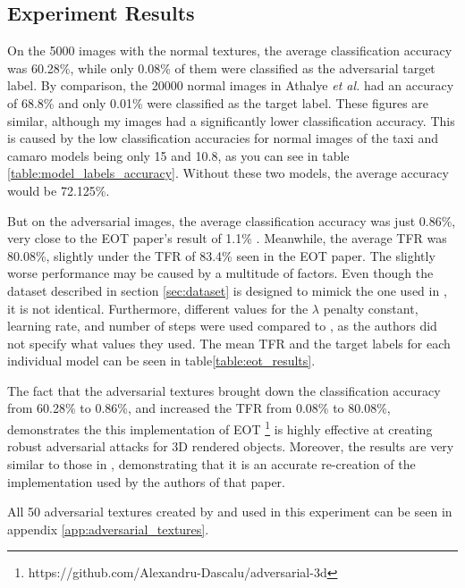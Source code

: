 \subsection{Experiment Results}

On the 5000 images with the normal textures, the average classification accuracy was 60.28\%, while only 0.08\% of them were classified as the adversarial target label. By comparison, the 20000 normal images in Athalye \textit{et al.} \cite{athalye} had an accuracy of 68.8\% and only 0.01\% were classified as the target label. These figures are similar, although my images had a significantly lower classification accuracy. This is caused by the low classification accuracies for normal images of the taxi and camaro models being only 15 and 10.8, as you can see in table \ref{table:model_labels_accuracy}. Without these two models, the average accuracy would be 72.125\%. 

But on the adversarial images, the average classification accuracy was just 0.86\%, very close to the EOT paper's result of 1.1\% \cite{athalye}. Meanwhile, the average TFR was 80.08\%, slightly under the TFR of 83.4\% seen in the EOT paper. The slightly worse performance may be caused by a multitude of factors. Even though the dataset described in section \ref{sec:dataset} is designed to mimick the one used in \cite{athalye}, it is not identical. Furthermore, different values for the $\lambda$ penalty constant, learning rate, and number of steps were used compared to \cite{athalye}, as the authors did not specify what values they used. The mean TFR and the target labels for each individual model can be seen in table\ref{table:eot_results}.

The fact that the adversarial textures brought down the classification accuracy from 60.28\% to 0.86\%, and increased the TFR from 0.08\% to 80.08\%, demonstrates the this implementation of EOT \footnote{https://github.com/Alexandru-Dascalu/adversarial-3d} is highly effective at creating robust adversarial attacks for 3D rendered objects. Moreover, the results are very similar to those in \cite{athalye}, demonstrating that it is an accurate re-creation of the implementation used by the authors of that paper.

All 50 adversarial textures created by and used in this experiment can be seen in appendix \ref{app:adversarial_textures}.


